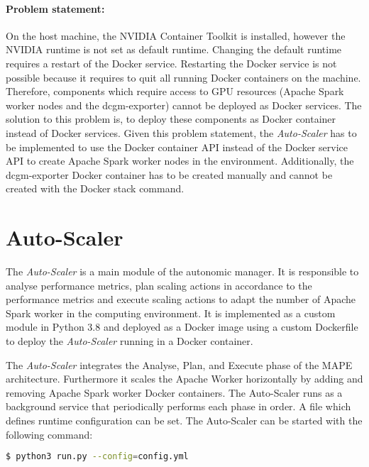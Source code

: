 \paragraph{Problem statement:}
On the host machine, the NVIDIA Container Toolkit is installed, however the NVIDIA runtime is not set as default runtime.
Changing the default runtime requires a restart of the Docker service. Restarting the Docker service is not possible because it requires to quit all running Docker containers on the machine. Therefore, components which require access to GPU resources (Apache Spark worker nodes and the dcgm-exporter) cannot be deployed as Docker services.
The solution to this problem is, to deploy these components as Docker container instead of Docker services.
Given this problem statement, the \textit{Auto-Scaler} has to be implemented to use the Docker container API instead of the Docker service API to create Apache Spark worker nodes in the environment. Additionally, the dcgm-exporter Docker container has to be created manually and cannot be created with the Docker stack command.


\section{Auto-Scaler}
The \textit{Auto-Scaler} is a main module of the autonomic manager. It is responsible to analyse performance metrics, plan scaling actions in accordance to the performance metrics and execute scaling actions to adapt the number of Apache Spark worker in the computing environment.
It is implemented as a custom module in Python 3.8 and deployed as a Docker image using a custom Dockerfile to deploy the \textit{Auto-Scaler} running in a Docker container.


The \textit{Auto-Scaler} integrates the Analyse, Plan, and Execute phase of the MAPE architecture. Furthermore it scales the Apache Worker horizontally by adding and removing Apache Spark worker Docker containers.
The Auto-Scaler runs as a background service that periodically performs each phase in order.
A file which defines runtime configuration can be set.
The Auto-Scaler can be started with the following command:
\begin{lstlisting}[label=lst:06_auto-scaler_start, caption=Auto-Scaler start command, language=sh]
$ python3 run.py --config=config.yml
\end{lstlisting}


